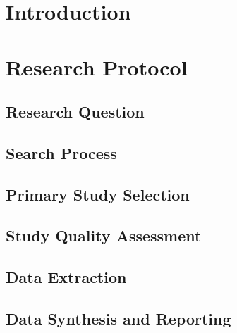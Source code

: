 \documentclass[12pt]{article}
\begin{document}
\section{Introduction}
\section{Research Protocol}
\subsection{Research Question}
\subsection{Search Process}
\subsection{Primary Study Selection}
\subsection{Study Quality Assessment}
\subsection{Data Extraction}
\subsection{Data Synthesis and Reporting}
\end{document}
